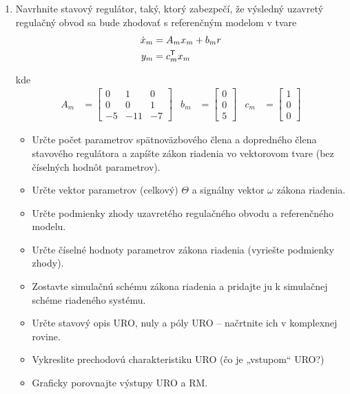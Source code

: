\documentclass[a4paper, 10pt, ]{article}
\begin{document}
\begin{enumerate}[leftmargin=0pt, labelsep=4mm, itemsep=0pt]
    \item Navrhnite stavový regulátor, taký, ktorý zabezpečí, že výsledný uzavretý regulačný obvod sa bude zhodovať s referenčným modelom v tvare
    \begin{subequations} \label{refmodelcv}
    \begin{align}
    	 \dot x_m &= A_m x_m + b_m r \\
    	 y_m &= c_m^{\mathsf{T}} x_m
    \end{align}
    \end{subequations}

    \vspace{-2mm}

    \noindent
    kde
    \begin{align*}
        A_m
        &=
        \begin{bmatrix}
        		0 & 1 & 0 \\
        		0 & 0 & 1 \\
        		-5 & -11 & -7
        \end{bmatrix}
        &
        b_m &= \begin{bmatrix} 0 \\ 0 \\ 5 \end{bmatrix}
        &
        c_m &= \begin{bmatrix} 1 \\ 0 \\ 0 \end{bmatrix}
    \end{align*}

    \begin{itemize}[leftmargin=0pt, labelsep=4mm, itemsep=0pt]
        \item Určte počet parametrov spätnoväzbového člena a dopredného člena stavového regulátora a zapíšte zákon riadenia vo vektorovom tvare (bez číselných hodnôt parametrov).
        \item Určte vektor parametrov (celkový) $\Theta$ a signálny vektor $\omega$ zákona riadenia. 
        \item Určte podmienky zhody uzavretého regulačného obvodu a referenčného modelu. 
        \item Určte číselné hodnoty parametrov zákona riadenia (vyriešte podmienky zhody). 
        \item Zostavte simulačnú schému zákona riadenia a pridajte ju k simulačnej schéme riadeného systému. 
        \item Určte stavový opis URO, nuly a póly URO -- načrtnite ich v komplexnej rovine. 
        \item Vykreslite prechodovú charakteristiku URO (čo je „vstupom“ URO?) 
        \item Graficky porovnajte výstupy URO a RM. 
    \end{itemize}












\end{enumerate}
\end{document}
